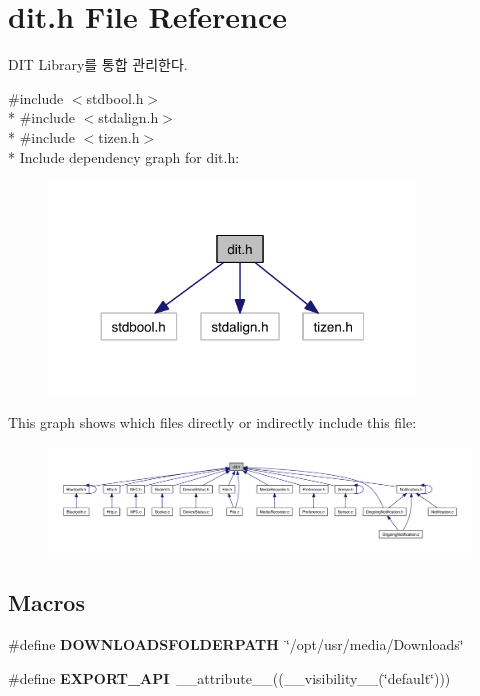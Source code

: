 \section{dit.\-h File Reference}
\label{dit_8h}


D\-I\-T Library를 통합 관리한다.  


{\ttfamily \#include $<$stdbool.\-h$>$}\\*
{\ttfamily \#include $<$stdalign.\-h$>$}\\*
{\ttfamily \#include $<$tizen.\-h$>$}\\*
Include dependency graph for dit.\-h\-:
\nopagebreak
\begin{figure}[H]
\begin{center}
\leavevmode
\includegraphics[width=276pt]{dit_8h__incl}
\end{center}
\end{figure}
This graph shows which files directly or indirectly include this file\-:
\nopagebreak
\begin{figure}[H]
\begin{center}
\leavevmode
\includegraphics[width=350pt]{dit_8h__dep__incl}
\end{center}
\end{figure}
\subsection*{Macros}
\begin{DoxyCompactItemize}
\item 
\#define {\bfseries D\-O\-W\-N\-L\-O\-A\-D\-S\-F\-O\-L\-D\-E\-R\-P\-A\-T\-H}~\char`\"{}/opt/usr/media/Downloads\char`\"{}\label{dit_8h_af029412212bf6a445500174d743cdd20}

\item 
\#define {\bfseries E\-X\-P\-O\-R\-T\-\_\-\-A\-P\-I}~\-\_\-\-\_\-attribute\-\_\-\-\_\-((\-\_\-\-\_\-visibility\-\_\-\-\_\-(\char`\"{}default\char`\"{})))\label{dit_8h_a3536620a51a6fa45b41e6d9ff6fc4ad3}

\end{DoxyCompactItemize}
